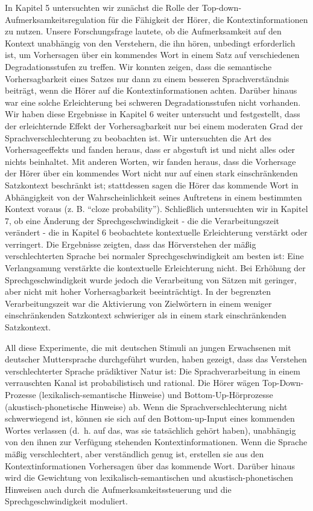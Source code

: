 \documentclass[a4paper, nobind]{templates/ociamthesis}
\begin{document}
\begin{romanpages}
\begin{abstractsecond}
In Kapitel 5 untersuchten wir zunächst die Rolle der Top-down-Aufmerksamkeitsregulation für die Fähigkeit der Hörer, die Kontextinformationen zu nutzen. Unsere Forschungsfrage lautete, ob die Aufmerksamkeit auf den Kontext unabhängig von den Verstehern, die ihn hören, unbedingt erforderlich ist, um Vorhersagen über ein kommendes Wort in einem Satz auf verschiedenen Degradationsstufen zu treffen. Wir konnten zeigen, dass die semantische Vorhersagbarkeit eines Satzes nur dann zu einem besseren Sprachverständnis beiträgt, wenn die Hörer auf die Kontextinformationen achten. Darüber hinaus war eine solche Erleichterung bei schweren Degradationsstufen nicht vorhanden. Wir haben diese Ergebnisse in Kapitel 6 weiter untersucht und festgestellt, dass der erleichternde Effekt der Vorhersagbarkeit nur bei einem moderaten Grad der Sprachverschlechterung zu beobachten ist. Wir untersuchten die Art des Vorhersageeffekts und fanden heraus, dass er abgestuft ist und nicht alles oder nichts beinhaltet. Mit anderen Worten, wir fanden heraus, dass die Vorhersage der Hörer über ein kommendes Wort nicht nur auf einen stark einschränkenden Satzkontext beschränkt ist; stattdessen sagen die Hörer das kommende Wort in Abhängigkeit von der Wahrscheinlichkeit seines Auftretens in einem bestimmten Kontext voraus (z. B. ``cloze probability''). Schließlich untersuchten wir in Kapitel 7, ob eine Änderung der Sprechgeschwindigkeit - die die Verarbeitungszeit verändert - die in Kapitel 6 beobachtete kontextuelle Erleichterung verstärkt oder verringert. Die Ergebnisse zeigten, dass das Hörverstehen der mäßig verschlechterten Sprache bei normaler Sprechgeschwindigkeit am besten ist: Eine Verlangsamung verstärkte die kontextuelle Erleichterung nicht. Bei Erhöhung der Sprechgeschwindigkeit wurde jedoch die Verarbeitung von Sätzen mit geringer, aber nicht mit hoher Vorhersagbarkeit beeinträchtigt. In der begrenzten Verarbeitungszeit war die Aktivierung von Zielwörtern in einem weniger einschränkenden Satzkontext schwieriger als in einem stark einschränkenden Satzkontext.

All diese Experimente, die mit deutschen Stimuli an jungen Erwachsenen mit deutscher Muttersprache durchgeführt wurden, haben gezeigt, dass das Verstehen verschlechterter Sprache prädiktiver Natur ist: Die Sprachverarbeitung in einem verrauschten Kanal ist probabilistisch und rational. Die Hörer wägen Top-Down-Prozesse (lexikalisch-semantische Hinweise) und Bottom-Up-Hörprozesse (akustisch-phonetische Hinweise) ab. Wenn die Sprachverschlechterung nicht schwerwiegend ist, können sie sich auf den Bottom-up-Input eines kommenden Wortes verlassen (d.~h. auf das, was sie tatsächlich gehört haben), unabhängig von den ihnen zur Verfügung stehenden Kontextinformationen. Wenn die Sprache mäßig verschlechtert, aber verständlich genug ist, erstellen sie aus den Kontextinformationen Vorhersagen über das kommende Wort. Darüber hinaus wird die Gewichtung von lexikalisch-semantischen und akustisch-phonetischen Hinweisen auch durch die Aufmerksamkeitssteuerung und die Sprechgeschwindigkeit moduliert.


\end{abstractsecond}
\end{romanpages}
\end{document}
